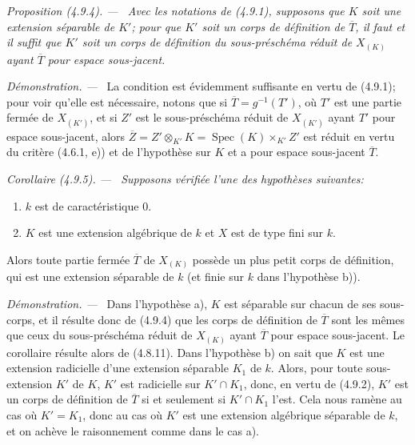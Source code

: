 \documentclass[10pt,oneside]{book}
\newenvironment{proposition}[1][]{%
  \par\medskip\noindent\itshape Proposition (#1). ---\ }{\par}
\newenvironment{corollary}[1][]{%
  \par\medskip\noindent\itshape Corollaire (#1). ---\ }{\par}
\newenvironment{proof}{%
  \par\medskip\noindent\textit{Démonstration. ---\ }}{\par}
\begin{document}
\begin{proposition}[4.9.4]
\label{IV.2.4.9.4-fr}
Avec les notations de (4.9.1), supposons que $K$ soit une extension séparable
de $K'$; pour que $K'$ soit un corps de définition de $\overline T$, il faut
et il suffit que $K'$ soit un corps de définition du sous-préschéma réduit de
$X_{(K)}$ ayant $\overline T$ pour espace sous-jacent.
\end{proposition}

\begin{proof}
La condition est évidemment suffisante en vertu de (4.9.1); pour voir qu'elle
est nécessaire, notons que si $\overline T=g^{-1}(T')$, où $T'$ est une
partie fermée de $X_{(K')}$, et si $Z'$ est le sous-préschéma réduit de
$X_{(K')}$ ayant $T'$ pour espace sous-jacent, alors
$\overline Z=Z'\otimes_{K'}K=\operatorname{Spec}(K)\times_{K'}Z'$ est réduit
en vertu du critère (4.6.1, e)) et de l'hypothèse sur $K$ et a pour espace
sous-jacent $\overline T$.
\end{proof}

\begin{corollary}[4.9.5]
\label{IV.2.4.9.5-fr}
Supposons vérifiée l'une des hypothèses suivantes:
\begin{enumerate}
\item[a)] $k$ est de caractéristique $0$.
\item[b)] $K$ est une extension algébrique de $k$ et $X$ est de type fini sur
$k$.
\end{enumerate}
Alors toute partie fermée $\overline T$ de $X_{(K)}$ possède un plus petit
corps de définition, qui est une extension séparable de $k$ (et finie sur $k$
dans l'hypothèse b)).
\end{corollary}

\begin{proof}
Dans l'hypothèse a), $K$ est séparable sur chacun de ses sous-corps, et il
résulte donc de (4.9.4) que les corps de définition de $\overline T$ sont les
mêmes que ceux du sous-préschéma réduit de $X_{(K)}$ ayant $\overline T$ pour
espace sous-jacent. Le corollaire résulte alors de (4.8.11). Dans l'hypothèse
b) on sait que $K$ est une extension radicielle d'une extension séparable
$K_1$ de $k$. Alors, pour toute sous-extension $K'$ de $K$, $K'$ est
radicielle sur $K'\cap K_1$, donc, en vertu de (4.9.2), $K'$ est un corps de
définition de $\overline T$ si et seulement si $K'\cap K_1$ l'est. Cela nous
ramène au cas où $K'=K_1$, donc au cas où $K'$ est une extension algébrique
séparable de $k$, et on achève le raisonnement comme dans le cas a).
\end{proof}
\end{document}
